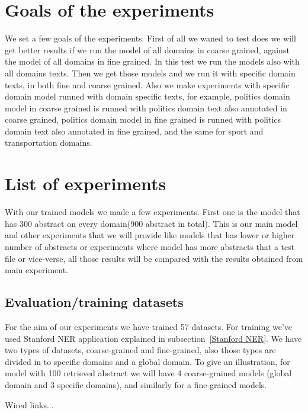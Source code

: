 \documentclass[thesis=M,english]{FITthesis}[2018/05/30]
\begin{document}
\section{Goals of the experiments}
	We set a few goals of the experiments. First of all we waned to test does we will get better results if we run the model of all domains in coarse grained, against the model of all domains in fine grained. In this test we run the models also with all domains texts. Then we get those models and we run it with specific domain texts, in both fine and coarse grained. Also we make experiments with specific domain model runned with domain specific texts, for example, politics domain model in coarse grained is runned with politics domain text also annotated in coarse grained, politics domain model in fine grained is runned with politics domain text also annotated in fine grained, and the same for sport and transportation domains.

\section{List of experiments}
	With our trained models we made a few experiments. First one is the model that has 300 abstract on every domain(900 abstract in total). This is our main model and other experiments that we will provide like models that has lower or higher number of abstracts or experiments where model has more abstracts that a test file or vice-verse, all those results will be compared with the results obtained from main experiment. 

	\subsection{Evaluation/training datasets}
For the aim of our experiments we have trained 57 datasets. For training we've used Stanford NER application explained in subsection~\ref{Stanford NER}. We have two types of datasets, coarse-grained and fine-grained, also those types are divided in to specific domains and a global domain. To give an illustration, for model with 100 retrieved abstract we will have 4 coarse-grained models (global domain and 3 specific domains), and similarly for a fine-grained models.

Wired links...

%
\end{document}
